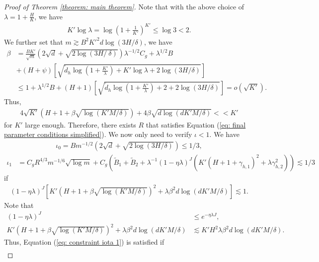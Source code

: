 \documentclass{article} \usepackage{iclr2023/iclr2023_conference,times}
\begin{document}
\begin{proof}[Proof of Theorem \ref{theorem: main theorem}]
Note that with the above choice of $\lambda = 1 + \frac{H}{K}$, we have \begin{align*}
    K' \log \lambda = \log (1 + \frac{1}{K'})^{K'} \leq \log 3 < 2.
\end{align*}
We further set that $ m \gtrsim B^2 K'^2 d \log (3 H / \delta)$, we have
\begin{align*}
    \beta &= \frac{B K' }{\sqrt{m}} (2 \sqrt{d} + \sqrt{2 \log ( 3H /\ \delta)}) \lambda^{-1/2} C_g + \lambda^{1/2}  B \\
    &+ (H + \psi) \left[ \sqrt{\tilde{d}_h \log (1 + \frac{K'}  {\lambda }) + K' \log \lambda + 2 \log (3 H / \delta)} \right] \\ 
    &\leq 1 + \lambda^{1/2}  B + (H + 1) \left[ \sqrt{\tilde{d}_h \log (1 + \frac{K'}  {\lambda }) + 2 + 2 \log (3 H / \delta)} \right] = o(\sqrt{K'}).
\end{align*}
Thus, 
\begin{align*}
     4 \sqrt{K'} (H + 1 + \beta \sqrt{\log (K' M / \delta)}) +  4 \beta \sqrt{ d \log (d K' M / \delta)} << K'
\end{align*}
for $K'$ large enough. Therefore, there exists $R$ that satisfies Equation (\ref{eq: final parameter conditions simplified}). We now only need to verify $\iota < 1$. We have 
\begin{align*}
    \iota_0 = B m^{-1/2} (2 \sqrt{d} + \sqrt{2 \log (3H / \delta)}) \leq 1/3,
\end{align*}
\begin{align*}
    \iota_1 &= C_g R^{4/3} m^{-1/6} \sqrt{ \log m} + C_g \left( \tilde{B}_1 + \tilde{B}_2 + \lambda^{-1}(1 - \eta \lambda)^J \left( K'(H + 1 + \gamma_{h,1} )^2 + \lambda \gamma_{h,2}^2\right) \right) \lesssim 1/3
\end{align*}
if 
\begin{align}
    (1 - \eta \lambda)^J  \left[ K'(H + 1 + \beta \sqrt{\log (K' M / \delta)} )^2 + \lambda  \beta^2 d \log (d K' M / \delta) \right] \lesssim 1. 
    \label{eq: constraint iota 1}
\end{align}
Note that 
\begin{align*}
    (1 - \eta \lambda)^J &\leq e^{-\eta \lambda J}, \\ 
    K'(H + 1 + \beta \sqrt{\log (K' M / \delta)} )^2 + \lambda  \beta^2 d \log (d K' M / \delta) &\lesssim K' H^2 \lambda  \beta^2 d \log (d K' M / \delta).
\end{align*}
Thus, Equation (\ref{eq: constraint iota 1}) is satisfied if 
\begin{align*}

\end{align*}
\end{proof}
\end{document}
